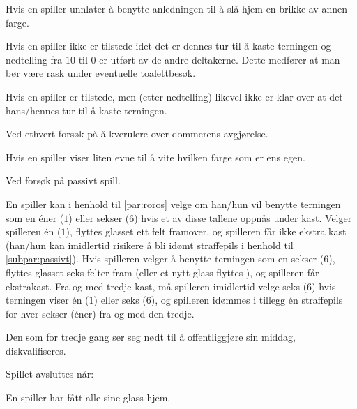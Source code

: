 \begin{ludol}
\begin{ludol}
  \item Hvis en spiller unnlater å benytte anledningen til å slå hjem en brikke
    av annen farge.

  \item Hvis en spiller ikke er tilstede idet det er dennes tur til å kaste
    terningen og nedtelling fra $10$ til $0$ er utført av de andre deltakerne.
    Dette medfører at man bør være rask under eventuelle toalettbesøk.

  \item Hvis en spiller er tilstede, men (etter nedtelling) likevel ikke er klar
    over at det hans/hennes tur til å kaste terningen.

  \item Ved ethvert forsøk på å kverulere over dommerens avgjørelse.

  \item Hvis en spiller viser liten evne til å vite hvilken farge som er ens
    egen.

  \item \label{subpar:passivt} Ved forsøk på passivt spill.

  \end{ludol}

\item \label{par:sekser-regelen} En spiller kan i henhold til \cref{par:roros}
  velge om han/hun vil benytte terningen som en éner ($1$) eller sekser ($6$)
  hvis et av disse tallene oppnås under kast. Velger spilleren én ($1$), flyttes
  glasset ett felt framover, og spilleren får ikke ekstra kast (han/hun kan
  imidlertid risikere å bli idømt straffepils i henhold til
  \cref{subpar:passivt}). Hvis spilleren velger å benytte terningen som en
  sekser ($6$), flyttes glasset seks felter fram (eller et nytt glass flyttes
  ), og spilleren får ekstrakast. Fra og med tredje kast, må
  spilleren imidlertid velge seks ($6$) hvis terningen viser én ($1$) eller seks
  ($6$), og spilleren idømmes i tillegg én straffepils for hver sekser (éner)
  fra og med den tredje.

\item \label{par:offentliggjore} Den som for tredje gang ser seg nødt til å
  offentliggjøre sin middag, diskvalifiseres.

\item \label{par:avsluttes} Spillet avsluttes når:

  \begin{ludol}

  \item \label{subpar:hjem} En spiller har fått alle sine glass hjem.


\end{ludol}
\end{ludol}
